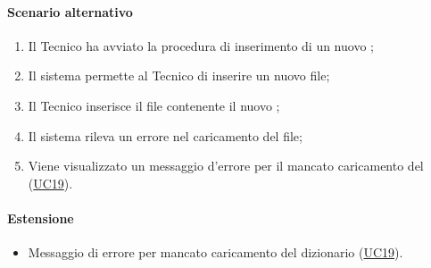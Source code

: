 \paragraph*{Scenario alternativo}
\begin{enumerate}
  \item Il Tecnico ha avviato la procedura di inserimento di un nuovo ;
  \item Il sistema permette al Tecnico di inserire un nuovo file;
  \item Il Tecnico inserisce il file contenente il nuovo ;
  \item Il sistema rileva un errore nel caricamento del file;
  \item Viene visualizzato un messaggio d'errore per il mancato caricamento del  (\hyperref[UC19]{UC19}).
\end{enumerate}

\paragraph*{Estensione}
\begin{itemize}
  \item Messaggio di errore per mancato caricamento del dizionario (\hyperref[UC19]{UC19}).
\end{itemize}
